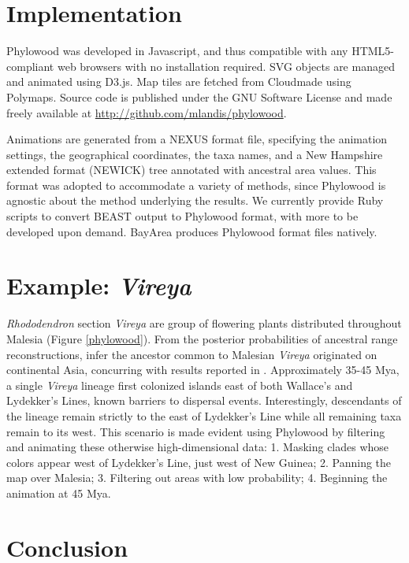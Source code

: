 \documentclass[11pt]{article}
\begin{document}
\section{Implementation}

Phylowood was developed in Javascript, and thus compatible with any HTML5-compliant web browsers with no installation required. SVG objects are managed and animated using D3.js. Map tiles are fetched from Cloudmade using Polymaps. Source code is published under the GNU Software License and made freely available at \url{http://github.com/mlandis/phylowood}.

Animations are generated from a NEXUS format file, specifying the animation settings, the geographical coordinates, the taxa names, and a New Hampshire extended format (NEWICK) tree annotated with ancestral area values. This format was adopted to accommodate a variety of methods, since Phylowood is agnostic about the method underlying the results. We currently provide Ruby scripts to convert BEAST output to Phylowood format, with more to be developed upon demand. BayArea produces Phylowood format files natively.

\section{Example: {\it Vireya}}

{\it Rhododendron} section {\it Vireya} are group of flowering plants distributed throughout Malesia (Figure \ref{phylowood}). From the posterior probabilities of ancestral range reconstructions, \cite{landis12} infer the ancestor common to Malesian {\it Vireya} originated on continental Asia, concurring with results reported in \cite{webb12}. Approximately 35-45 Mya, a single {\it Vireya} lineage first colonized islands east of both Wallace's and Lydekker's Lines, known barriers to dispersal events. Interestingly, descendants of the lineage remain strictly to the east of Lydekker's Line while all remaining taxa remain to its west. This scenario is made evident using Phylowood by filtering and animating these otherwise high-dimensional data: 1. Masking clades whose colors appear west of Lydekker's Line, just west of New Guinea; 2. Panning the map over Malesia; 3. Filtering out areas with low probability; 4. Beginning the animation at 45 Mya.

\section{Conclusion}
\end{document}
